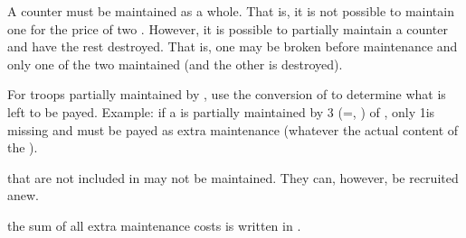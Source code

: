 \aparag A counter must be maintained as a whole. That is, it is not possible
to maintain one \ARMY\Facemoins for the price of two \LD.
\bparag However, it is possible to partially maintain a counter and have the
rest destroyed. That is, one \ARMY\Facemoins may be broken before maintenance
and only one of the two \LD maintained (and the other is destroyed).

\aparag For troops partially maintained by , use the
conversion of  to determine what is left to be payed.
\bparag Example: if a \FLEET\Faceplus is partially maintained by 3\ND
(=\FLEET\Facemoins, \ND) of , only 1\ND is missing and must
be payed as extra maintenance (whatever the actual content of the \FLEET).

\aparag \corsaire that are not included in  may not be
maintained. They can, however, be recruited anew.


\aparag the sum of all extra maintenance costs is written in .

